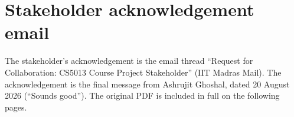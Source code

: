 \documentclass[11pt,a4paper]{article}
\begin{document}
\appendix
\renewcommand{\thesection}{Appendix~\Alph{section}}

\section{Stakeholder acknowledgement email}\label{app:email}

The stakeholder's acknowledgement is the email thread ``Request for
Collaboration: CS5013 Course Project Stakeholder'' (IIT Madras Mail). The
acknowledgement is the final message from Ashrujit Ghoshal, dated
20 August 2026 (``Sounds good''). The original PDF is included in full on
the following pages.


\end{document}
